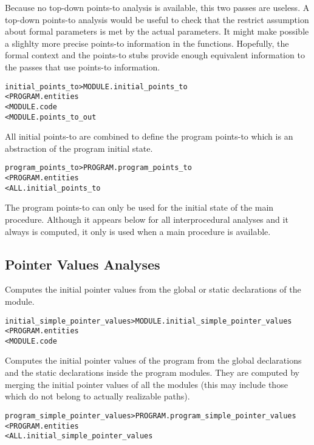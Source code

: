 \documentclass[a4paper]{report}
\newenvironment{PipsMake}{\begin{alltt}}{\end{alltt}}
\newenvironment{PipsPass}[1]{\label{pass:#1}}{}
\begin{document}
Because no top-down points-to analysis is available, this two passes
are useless. A top-down points-to analysis would be useful to check
that the restrict assumption about formal parameters is met by the
actual parameters. It might make possible a slighlty more precise
points-to information in the functions. Hopefully, the formal context
and the points-to stubs provide enough equivalent information to the
passes that use points-to information.

\begin{PipsMake}
initial_points_to     > MODULE.initial_points_to
        < PROGRAM.entities
        < MODULE.code
        < MODULE.points_to_out
\end{PipsMake}

All initial points-to are combined to define the program points-to which is an
abstraction of the program initial state.

\begin{PipsMake}
program_points_to     > PROGRAM.program_points_to
        < PROGRAM.entities
        < ALL.initial_points_to
\end{PipsMake}

The program points-to can only be used for the initial state of the
main procedure. Although it appears below for all interprocedural analyses
and it always is computed, it only is used when a main procedure is
available.

\subsection{Pointer Values Analyses}
\label{subsection-pointer-values}


\begin{PipsPass}{initial_simple_pointer_values}
  Computes the initial pointer values from the global or static declarations of the module.
\end{PipsPass}
\begin{PipsMake}
initial_simple_pointer_values > MODULE.initial_simple_pointer_values
           < PROGRAM.entities
           < MODULE.code
\end{PipsMake}

\begin{PipsPass}{program_simple_pointer_values}
  Computes the initial pointer values of the program from the global
  declarations and the static declarations inside the program
  modules. They are computed by merging the initial pointer values of
  all the modules (this may include those which do not belong to
  actually realizable paths).
\end{PipsPass}
\begin{PipsMake}
program_simple_pointer_values > PROGRAM.program_simple_pointer_values
           < PROGRAM.entities
           < ALL.initial_simple_pointer_values
\end{PipsMake}
\end{document}
